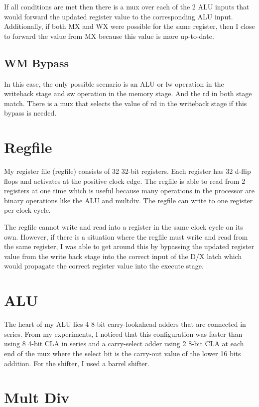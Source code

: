 \documentclass[letterpaper]{article} %
\begin{document}
If all conditions are met then there is a mux over each of the 2 ALU inputs that would forward the updated register value to the corresponding ALU input. Additionally, if both MX and WX were possible for the same register, then I close to forward the value from MX because this value is more up-to-date.

\subsection{WM Bypass}
In this case, the only possible scenario is an ALU or lw operation in the writeback stage and sw operation in the memory stage. And the rd in both stage match. There is a mux that selects the value of rd in the writeback stage if this bypass is needed.

\section{Regfile}
My register file (regfile) consists of 32 32-bit registers. Each register has 32 d-flip flops and activates at the positive clock edge. The regfile is able to read from 2 registers at one time which is useful because many operations in the processor are binary operations like the ALU and multdiv. The regfile can write to one register per clock cycle. 

The regfile cannot write and read into a register in the same clock cycle on its own. However, if there is a situation where the regfile must write and read from the same register, I was able to get around this by bypassing the updated register value from the write back stage into the correct input of the D/X latch which would propagate the correct register value into the execute stage.

\section{ALU}
The heart of my ALU lies 4 8-bit carry-lookahead adders that are connected in series. From my experiments, I noticed that this configuration was faster than using 8 4-bit CLA in series and a carry-select adder using 2 8-bit CLA at each end of the mux where the select bit is the carry-out value of the lower 16 bits addition. For the shifter, I used a barrel shifter.

\section{Mult Div}
\end{document}
